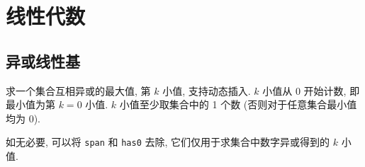 \clearpage
\section{线性代数}


\subsection{异或线性基}
求一个集合互相异或的最大值, 第 $k$ 小值, 支持动态插入. $k$ 小值从 0 开始计数, 即最小值为第 $k=0$ 小值. $k$ 小值至少取集合中的 1 个数 (否则对于任意集合最小值均为 0).

如无必要, 可以将 \lstinline{span} 和 \lstinline{has0} 去除, 它们仅用于求集合中数字异或得到的 $k$ 小值.


